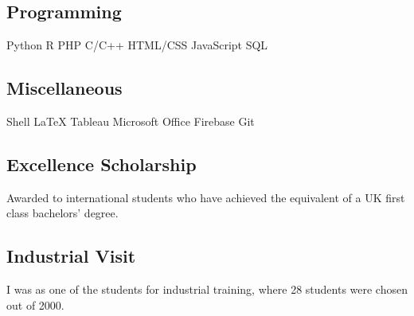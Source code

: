 \documentclass[a4paper]{MagicalCV}
\begin{document}
\begin{minipage}[t]{0.33\textwidth}

\subsection{Programming}
Python \textbullet{}   R \textbullet{} PHP \textbullet{} C/C++ \textbullet{} HTML/CSS  \textbullet{}
JavaScript \textbullet{} SQL 
\sectionsep
\subsection{Miscellaneous}
Shell \textbullet{} \LaTeX \textbullet{} Tableau \textbullet{} Microsoft Office \textbullet{} Firebase \textbullet{} Git
\sectionsep


\subsection{Excellence Scholarship}
\vspace{\topsep} %
Awarded to international students who have achieved the equivalent of a UK first class bachelors' degree.
\sectionsep

\subsection{Industrial Visit}
\vspace{\topsep} %
I was as one of the students for industrial training, where 28 students were chosen out of 2000.
\sectionsep

\end{minipage} 
\hfill
\end{document}
